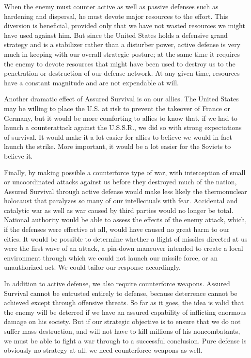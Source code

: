 When the enemy must counter active as well as passive defenses such as hardening and dispersal, he must devote major resources to the effort. This diversion is beneficial, provided only that we have not wasted resources we might have used against him. But since the United States holds a defensive grand strategy and is a stabilizer rather than a disturber power, active defense is very much in keeping with our overall strategic posture; at the same time it requires the enemy to devote resources that might have been used to destroy us to the penetration or destruction of our defense network. At any given time, resources have a constant magnitude and are not expendable at will.

Another dramatic effect of Assured Survival is on our allies. The United States may be willing to place the U.S. at risk to prevent the takeover of France or Germany, but it would be more comforting to allies to know that, if we had to launch a counterattack against the U.S.S.R., we did so with strong expectations of survival. It would make it a lot easier for allies to believe we would in fact launch the strike. More important, it would be a lot easier for the Soviets to believe it.

Finally, by making possible a counterforce type of war, with interception of small or uncoordinated attacks against us before they destroyed much of the nation, Assured Survival through active defense would make less likely the thermonuclear holocaust that paralyzes so many of our intellectuals with fear. Accidental and catalytic war as well as war caused by third parties would no longer be total. National authority would be able to assess the effects of the enemy attack, which, if the defenses were effective at all, would have caused no great harm to our cities. It would be possible to determine whether a flight of missiles directed at us were the first wave of an attack, a pin-down maneuver intended to create a local environment through which we could not launch our missile force, or an unauthorized act. We could tailor our response accordingly.

In addition to active defense, we also require counterforce weapons. Assured Survival cannot be entrusted entirely to defense, because deterrence cannot be achieved except through offensive threats. So far as it goes, the idea is valid that the enemy will be deterred if we have an assured capability of inflicting enormous damage on his society. But if our strategic objective is to ensure that we do not suffer mass destruction, and will not have to kill millions of his noncombatants, we must be able to fight a war through to a successful conclusion. Pure defense is obviously no strategy at all; we need counterforce weapons as well.

